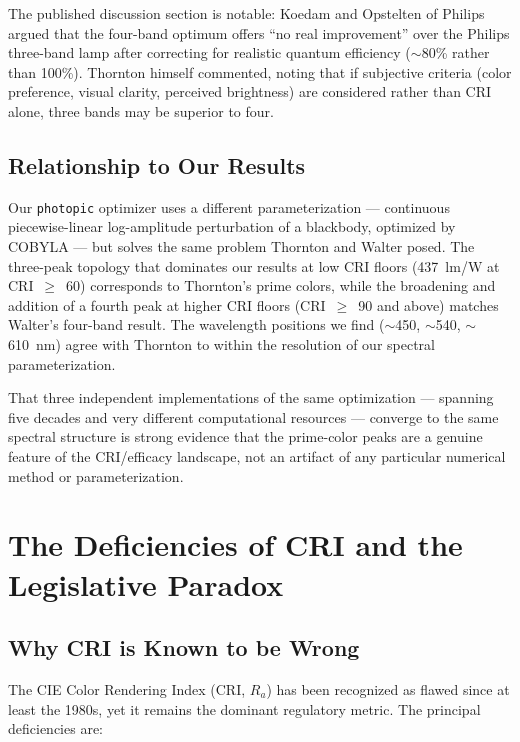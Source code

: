 \documentclass[11pt]{article}
\begin{document}
The published discussion section is notable: Koedam and Opstelten of
Philips argued that the four-band optimum offers ``no real improvement''
over the Philips three-band lamp after correcting for realistic quantum
efficiency ($\sim$80\% rather than 100\%).  Thornton himself commented,
noting that if subjective criteria (color preference, visual clarity,
perceived brightness) are considered rather than CRI alone, three bands
may be superior to four.

\subsection{Relationship to Our Results}

Our \texttt{photopic} optimizer uses a different parameterization ---
continuous piecewise-linear log-amplitude perturbation of a blackbody,
optimized by COBYLA --- but solves the same problem Thornton and Walter
posed.  The three-peak topology that dominates our results at low CRI
floors (437~lm/W at CRI~$\geq$~60) corresponds to Thornton's prime
colors, while the broadening and addition of a fourth peak at higher CRI
floors (CRI~$\geq$~90 and above) matches Walter's four-band result.  The
wavelength positions we find ($\sim$450, $\sim$540, $\sim$610~nm) agree
with Thornton to within the resolution of our spectral parameterization.

That three independent implementations of the same optimization --- spanning
five decades and very different computational resources --- converge to the
same spectral structure is strong evidence that the prime-color peaks are a
genuine feature of the CRI/efficacy landscape, not an artifact of any
particular numerical method or parameterization.

\section{The Deficiencies of CRI and the Legislative Paradox}

\subsection{Why CRI is Known to be Wrong}

The CIE Color Rendering Index (CRI, $R_a$) has been recognized as
flawed since at least the 1980s, yet it remains the dominant regulatory
metric.  The principal deficiencies are:
\end{document}

